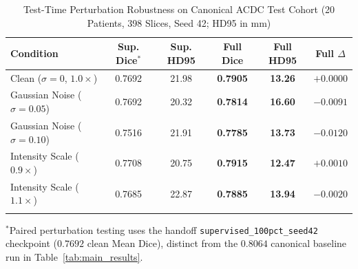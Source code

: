 \documentclass[pdflatex,sn-mathphys]{sn-jnl}
\theoremstyle{thmstyleone}
\theoremstyle{thmstyletwo}
\theoremstyle{thmstylethree}
\begin{document}
\begin{table}[htbp]
\caption{Test-Time Perturbation Robustness on Canonical ACDC Test Cohort (20 Patients, 398 Slices, Seed 42; HD95 in mm)}%
\label{tab:robustness}
\renewcommand{\arraystretch}{1.15}
\centering
\scriptsize
\setlength{\tabcolsep}{4pt}
\begin{tabular}{@{}lccccc@{}}
\toprule
\textbf{Condition} & \textbf{Sup. Dice$^*$} & \textbf{Sup. HD95} & \textbf{Full Dice} & \textbf{Full HD95} & \textbf{Full $\Delta$} \\
\midrule
Clean ($\sigma=0$, $1.0\times$)  & 0.7692 & 21.98 & \textbf{0.7905} & \textbf{13.26} & $+0.0000$ \\
Gaussian Noise ($\sigma=0.05$)    & 0.7692 & 20.32 & \textbf{0.7814} & \textbf{16.60} & $-0.0091$ \\
Gaussian Noise ($\sigma=0.10$)    & 0.7516 & 21.91 & \textbf{0.7785} & \textbf{13.73} & $-0.0120$ \\
Intensity Scale ($0.9\times$)     & 0.7708 & 20.75 & \textbf{0.7915} & \textbf{12.47} & $+0.0010$ \\
Intensity Scale ($1.1\times$)     & 0.7685 & 22.87 & \textbf{0.7885} & \textbf{13.94} & $-0.0020$ \\
\botrule
\end{tabular}
\begin{tablenotes}
\scriptsize
\item $^*$Paired perturbation testing uses the handoff \texttt{supervised\_100pct\_seed42} checkpoint ($0.7692$ clean Mean Dice), distinct from the $0.8064$ canonical baseline run in Table~\ref{tab:main_results}.
\end{tablenotes}
\end{table}
\end{document}
